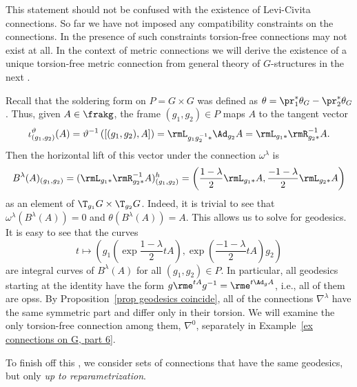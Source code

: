 \begin{rem}
    This statement should not be confused with the existence of Levi-Civita connections. So far we have not imposed any compatibility constraints on the connections. In the presence of such constraints torsion-free connections may not exist at all. In the context of metric connections we will derive the existence of a unique torsion-free metric connection from general theory of $G$-structures in the next \sect.
\end{rem}



\begin{example}\label{ex connections on G, part 5}
    Recall that the soldering form on $P=G\times G$ was defined as $\theta=\pr_1^\ast\theta_G-\pr_2^\ast\theta_G$. Thus, given $A\in\frakg$, the frame $(g_1,g_2)\in P$ maps $A$ to the tangent vector 
    \[\iota_{(g_1,g_2)}^\vartheta(A)=\vartheta^{-1}\left([(g_1,g_2),A]\right)=\rmL_{g_1g_2^{-1}\ast}\Ad_{g_2}A=\rmL_{g_1\ast}\rmR_{g_2\ast}^{-1}A.\]
    Then the horizontal lift of this vector under the connection $\omega^\lambda$ is 
    \[B^\lambda(A)_{(g_1,g_2)}=(\rmL_{g_1\ast}\rmR_{g_2\ast}^{-1}A)_{(g_1,g_2)}^h=\left(\frac{1-\lambda}{2}\rmL_{g_1\ast}A, \frac{-1-\lambda}{2}\rmL_{g_2\ast}A\right)\]
    as an element of $\T_{g_1}G\times \T_{g_2}G$. Indeed, it is trivial to see that $\omega^\lambda(B^\lambda(A))=0$ and $\theta(B^\lambda(A))=A$. 
    This allows us to solve for geodesics. It is easy to see that the curves 
    \[t\mapsto \left(g_1\left(\exp\frac{1-\lambda}{2}tA\right),\exp\left(\frac{-1-\lambda}{2}tA\right)g_2\right)\] 
    are integral curves of $B^\lambda(A)$ for all $(g_1,g_2)\in P$. In particular, all geodesics starting at the identity have the form $g\rme^{tA}g^{-1}=\rme^{t\Ad_g A}$, i.e., all of them are \glspl{ops}. By Proposition~\ref{prop geodesics coincide}, all of the connections $\nabla^\lambda$ have the same symmetric part and differ only in their torsion. We will examine the only torsion-free connection among them, $\nabla^0$, separately in Example~\ref{ex connections on G, part 6}.
\end{example}



To finish off this \sect, we consider sets of connections that have the same geodesics, but only \emph{up to reparametrization}.


